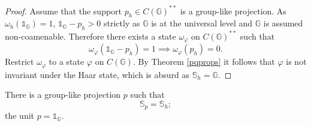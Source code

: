 \documentclass[12pt]{amsart}
\theoremstyle{remark}
\theoremstyle{remark}
\begin{document}
\begin{proof}
Assume that the support $p_h\in C(\mathbb{G})^{**}$ is a group-like projection. As $\omega_h(\mathds{1}_{\mathbb{G}})=1$, $\mathds{1}_{\mathbb{G}}-p_h>0$ strictly as $\mathbb{G}$ is at the universal level and $\mathbb{G}$ is assumed non-coamenable. Therefore there exists a state $\omega_\varphi$ on $C(\mathbb{G})^{**}$ such that
$$\omega_\varphi(\mathds{1}_{\mathbb{G}}-p_h)=1\implies \omega_\varphi(p_h)=0.$$
Restrict $\omega_\varphi$ to a state $\varphi$ on $C(\mathbb{G})$. By Theorem \ref{pqprops} it follows that $\varphi$ is not invariant under the Haar state, which is absurd as $\mathbb{S}_h=\mathbb{G}$.
\end{proof}
There is a group-like projection $p$ such that
$$\mathbb{S}_p=\mathbb{S}_h;$$
the unit $p=\mathds{1}_{\mathbb{G}}$.

\bigskip
\end{document}
